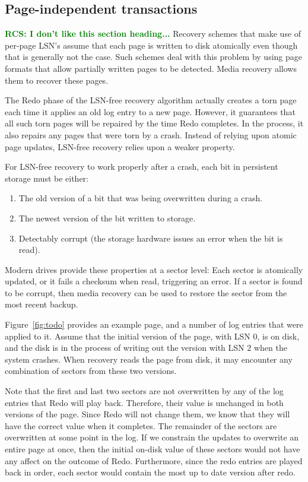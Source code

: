 \documentclass[letterpaper,twocolumn,10pt]{article}
\newcommand{\rcs}[1]{\textcolor{green}{\bf RCS: #1}}
\begin{document}
\subsection{Page-independent transactions}
\rcs{I don't like this section heading...}  Recovery schemes that make
use of per-page LSN's assume that each page is written to disk
atomically even though that is generally not the case.  Such schemes
deal with this problem by using page formats that allow partially
written pages to be detected.  Media recovery allows them to recover
these pages.  

The Redo phase of the LSN-free recovery algorithm actually creates a
torn page each time it applies an old log entry to a new page.
However, it guarantees that all such torn pages will be repaired by
the time Redo completes.  In the process, it also repairs any pages
that were torn by a crash.  Instead of relying upon atomic page
updates, LSN-free recovery relies upon a weaker property.

For LSN-free recovery to work properly after a crash, each bit in
persistent storage must be either:

\begin{enumerate}
\item The old version of a bit that was being overwritten during a crash.
\item The newest version of the bit written to storage.
\item Detectably corrupt (the storage hardware issues an error when the
  bit is read).
\end{enumerate}

Modern drives provide these properties at a sector level: Each sector
is atomically updated, or it fails a checksum when read, triggering an
error.  If a sector is found to be corrupt, then media recovery can be
used to restore the sector from the most recent backup.

Figure~\ref{fig:todo} provides an example page, and a number of log
entries that were applied to it.  Assume that the initial version of
the page, with LSN $0$, is on disk, and the disk is in the process of
writing out the version with LSN $2$ when the system crashes.  When
recovery reads the page from disk, it may encounter any combination of
sectors from these two versions.

Note that the first and last two sectors are not overwritten by any
of the log entries that Redo will play back.  Therefore, their value
is unchanged in both versions of the page.  Since Redo will not change
them, we know that they will have the correct value when it completes.
The remainder of the sectors are overwritten at some point in the log.
If we constrain the updates to overwrite an entire page at once, then
the initial on-disk value of these sectors would not have any affect
on the outcome of Redo.  Furthermore, since the redo entries are
played back in order, each sector would contain the most up to date
version after redo.
\end{document}
